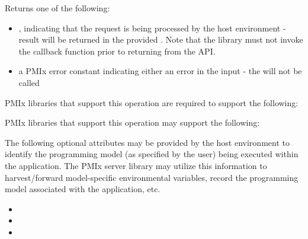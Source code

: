 Returns one of the following:

\begin{itemize}
    \item {}, indicating that the request is being processed by the host environment - result will be returned in the provided . Note that the library must not invoke the callback function prior to returning from the \ac{API}.
    \item a PMIx error constant indicating either an error in the input - the  will not be called
\end{itemize}


\reqattrstart
\ac{PMIx} libraries that support this operation are required to support the following:


\reqattrend

\optattrstart
\ac{PMIx} libraries that support this operation may support the following:


The following optional attributes may be provided by the host environment to identify the programming model (as specified by the user) being executed within the application. The \ac{PMIx} server library may utilize this information to harvest/forward model-specific environmental variables, record the programming model associated with the application, etc.

\begin{itemize}
    \item {}
    \item {}
    \item {}
\end{itemize}

\optattrend

\descr

